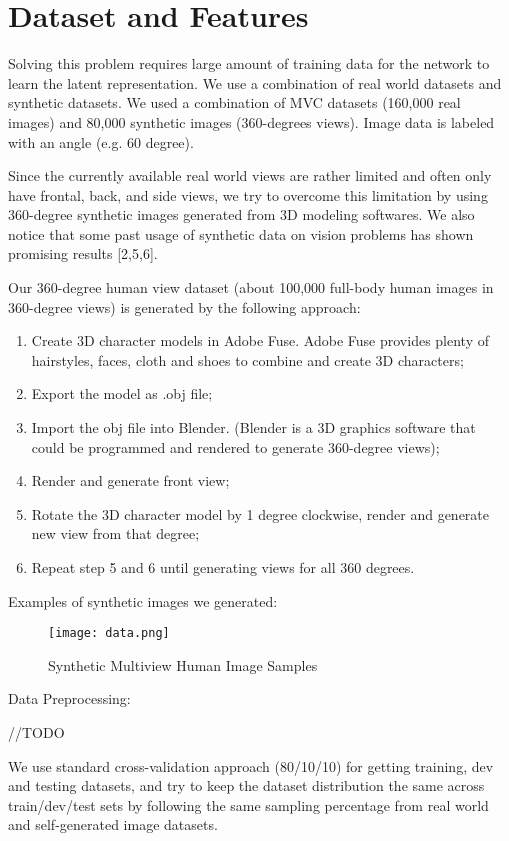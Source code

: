 \documentclass[10pt,conference]{IEEEtran}
\begin{document}
\section{Dataset and Features}
Solving this problem requires large amount of training data for the network to learn the latent representation. We use a combination of real world datasets and synthetic datasets. We used a combination of MVC datasets (160,000 real images) and 80,000 synthetic images (360-degrees views). Image data is labeled with an angle (e.g. 60 degree).

Since the currently available real world views are rather limited and often only have frontal, back, and side views, we try to overcome this limitation by using 360-degree synthetic images generated from 3D modeling softwares. We also notice that some past usage of synthetic data on vision problems has shown promising results [2,5,6].

Our 360-degree human view dataset (about 100,000 full-body human images in 360-degree views) is generated by the following approach:
\renewcommand{\labelenumi}{\roman{enumi}}
 \begin{enumerate}
   \item Create 3D character models in Adobe Fuse. Adobe Fuse provides plenty of hairstyles, faces, cloth and shoes to combine and create 3D characters;
   \item Export the model as .obj file;
   \item Import the obj file into Blender. (Blender is a 3D graphics software that could be programmed and rendered to generate 360-degree views);
   \item Render and generate front view;
   \item Rotate the 3D character model by 1 degree clockwise, render and generate new view from that degree;
   \item Repeat step 5 and 6 until generating views for all 360 degrees.   
 \end{enumerate}

Examples of synthetic images we generated:

\begin{figure}[htbp]
\centering
\texttt{[image: data.png]}
\caption{Synthetic Multiview Human Image Samples}
\end{figure}

Data Preprocessing:

//TODO

We use standard cross-validation approach (80/10/10) for getting training, dev and testing datasets, and try to keep the dataset distribution the same across train/dev/test sets by following the same sampling percentage from real world and self-generated image datasets.
\end{document}
